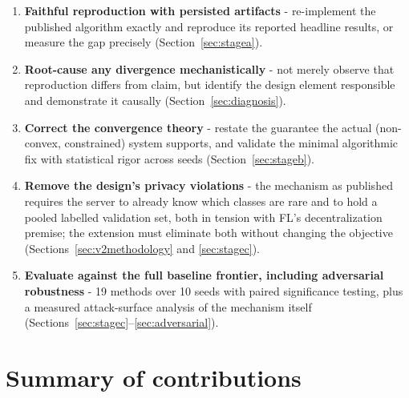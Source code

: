 \documentclass[11pt,a4paper]{report}
\begin{document}
\begin{enumerate}[label=\textbf{O\arabic*.}]
\item \textbf{Faithful reproduction with persisted artifacts} - re-implement
the published algorithm exactly and reproduce its reported headline results,
or measure the gap precisely (Section~\ref{sec:stagea}).
\item \textbf{Root-cause any divergence mechanistically} - not merely observe
that reproduction differs from claim, but identify the design element
responsible and demonstrate it causally (Section~\ref{sec:diagnosis}).
\item \textbf{Correct the convergence theory} - restate the guarantee the
actual (non-convex, constrained) system supports, and validate the minimal
algorithmic fix with statistical rigor across seeds (Section~\ref{sec:stageb}).
\item \textbf{Remove the design's privacy violations} - the mechanism as
published requires the server to already know which classes are rare and to
hold a pooled labelled validation set, both in tension with FL's
decentralization premise; the extension must eliminate both without changing
the objective (Sections~\ref{sec:v2methodology} and \ref{sec:stagec}).
\item \textbf{Evaluate against the full baseline frontier, including
adversarial robustness} - 19 methods over 10 seeds with paired significance
testing, plus a measured attack-surface analysis of the mechanism itself
(Sections~\ref{sec:stagec}--\ref{sec:adversarial}).
\end{enumerate}

\section{Summary of contributions}
\label{sec:contributions}
\end{document}
